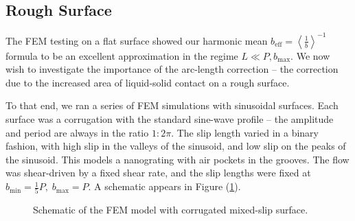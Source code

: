 \documentclass[12pt, a4paper, twoside, openright]{book}
\newcommand{\bmin}{\ensuremath{b_{\mathrm{min}}}}
\newcommand{\bmax}{\ensuremath{b_{\mathrm{max}}}}
\newcommand{\beffh}{\ensuremath{b_{\mathrm{eff}}} = \left< \frac{1}{b} \right>^{-1} }
\begin{document}
\clearpage
\subsection{Rough Surface}

The FEM testing on a flat surface showed our harmonic mean $\beffh$ formula to be an excellent approximation in the regime $L \ll P, \bmax$.  We now wish to investigate the importance of the arc-length correction -- the correction due to the increased area of liquid-solid contact on a rough surface.

To that end, we ran a series of FEM simulations with sinusoidal surfaces. Each surface was a corrugation with the standard sine-wave profile -- the amplitude and period are always in the ratio $1:2\pi$.  The slip length varied in a binary fashion, with high slip in the valleys of the sinusoid, and low slip on the peaks of the sinusoid.  This models a nanograting with air pockets in the grooves.  The flow was shear-driven by a fixed shear rate, and the slip lengths were fixed at $\bmin = \frac{1}{5} P, \; \bmax = P$.  A schematic appears in Figure (\ref{FEMroughmodel}).

\begin{figure}[ht]
\centering
{}
\caption{Schematic of the FEM model with corrugated mixed-slip surface.}\label{FEMroughmodel}
\end{figure}
\end{document}
